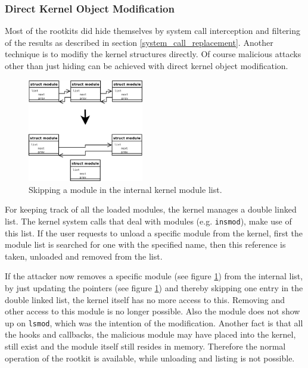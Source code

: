 \subsubsection{Direct Kernel Object Modification}
Most of the rootkits did hide themselves by system call interception 
and filtering of the results as described in section \ref{system_call_replacement}. 
Another technique is to modifiy the kernel structures directly. Of course malicious 
attacks other than just hiding can be achieved with direct kernel object modification.

\begin{figure}[htb]
	\begin{center}
	\includegraphics[width=0.45\textwidth]{imgs/module_list_modification.pdf}
	\caption{Skipping a module in the internal kernel module list.}
	\end{center}
	\label{skip_module}
\end{figure}

For keeping track of all the loaded modules, the kernel manages a double linked list. The kernel system 
calls that deal with modules (e.g. \texttt{insmod}), make use of this list. 
If the user requests to unload a specific module from the kernel, first the module list is searched 
for one with the specified name, then this reference is taken, unloaded and removed from the list.

If the attacker now removes a specific module (see figure \ref{skip_module}) from the internal list, by just 
updating the pointers (see figure \ref{skip_module}) and thereby skipping one entry in the double linked list, 
the kernel itself has no more access to this. Removing and other access to this module is no longer possible. 
Also the module does not show up on \texttt{lsmod}, which was the intention of the modification. 
Another fact is that all the hooks and callbacks, the malicious module may have placed into the kernel, still exist 
and the module itself still resides in memory. Therefore the normal operation of the rootkit is available, while 
unloading and listing is not possible.

